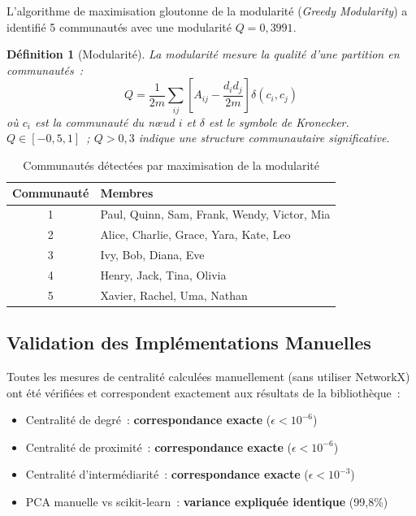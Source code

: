 \documentclass[12pt,a4paper]{article}
\newtheorem{definition}{Définition}[section]
\begin{document}
L'algorithme de maximisation gloutonne de la modularité (\emph{Greedy Modularity}) a identifié 5 communautés avec une modularité $Q = 0{,}3991$.

\begin{definition}[Modularité]
La modularité mesure la qualité d'une partition en communautés~:
\[
    Q = \frac{1}{2m} \sum_{ij} \left[ A_{ij} - \frac{d_i d_j}{2m} \right] \delta(c_i, c_j)
\]
où $c_i$ est la communauté du n\oe{}ud $i$ et $\delta$ est le symbole de Kronecker. $Q \in [-0{,}5, 1]$~; $Q > 0{,}3$ indique une structure communautaire significative.
\end{definition}

\begin{table}[H]
\centering
\begin{tabular}{cl}
\toprule
\textbf{Communauté} & \textbf{Membres} \\
\midrule
1 & Paul, Quinn, Sam, Frank, Wendy, Victor, Mia \\
2 & Alice, Charlie, Grace, Yara, Kate, Leo \\
3 & Ivy, Bob, Diana, Eve \\
4 & Henry, Jack, Tina, Olivia \\
5 & Xavier, Rachel, Uma, Nathan \\
\bottomrule
\end{tabular}
\caption{Communautés détectées par maximisation de la modularité}
\end{table}

\subsection{Validation des Implémentations Manuelles}

Toutes les mesures de centralité calculées manuellement (sans utiliser NetworkX) ont été vérifiées et correspondent exactement aux résultats de la bibliothèque~:

\begin{itemize}
    \item Centralité de degré~: \textbf{correspondance exacte} ($\epsilon < 10^{-6}$)
    \item Centralité de proximité~: \textbf{correspondance exacte} ($\epsilon < 10^{-6}$)
    \item Centralité d'intermédiarité~: \textbf{correspondance exacte} ($\epsilon < 10^{-3}$)
    \item PCA manuelle vs scikit-learn~: \textbf{variance expliquée identique} (99,8\%)
\end{itemize}
\end{document}

